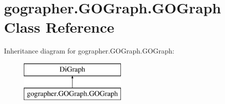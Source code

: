 \hypertarget{classgographer_1_1_g_o_graph_1_1_g_o_graph}{\section{gographer.\-G\-O\-Graph.\-G\-O\-Graph Class Reference}
\label{classgographer_1_1_g_o_graph_1_1_g_o_graph}
}
Inheritance diagram for gographer.\-G\-O\-Graph.\-G\-O\-Graph\-:\begin{figure}[H]
\begin{center}
\leavevmode
\includegraphics[height=2.000000cm]{classgographer_1_1_g_o_graph_1_1_g_o_graph}
\end{center}
\end{figure}
